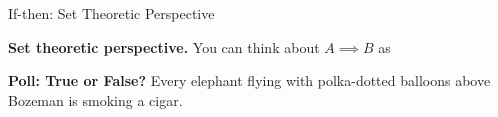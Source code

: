 \documentclass[10pt]{beamer}
\begin{document}
\begin{frame}{If-then: Set Theoretic Perspective}
\vfill 
\pause 

 \vfill 
 \pause 
\vfill  
\colorbox{yellow!30}{\textbf{Set theoretic perspective.}}  You can think about $A \implies B$ as 

\end{frame}


{ 
\begin{frame}
\centering 
\Large \color{black} \textbf{Poll: True or False?} Every elephant flying with polka-dotted balloons above Bozeman is smoking a cigar. \color{black}
\vfill \vfill \vfill \vfill 
\end{frame}
}
\end{document}

